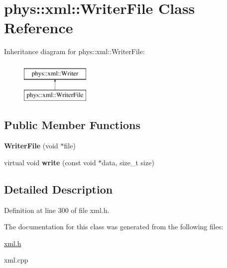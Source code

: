 \hypertarget{classphys_1_1xml_1_1WriterFile}{
\section{phys::xml::WriterFile Class Reference}
\label{dc/d53/classphys_1_1xml_1_1WriterFile}
}
Inheritance diagram for phys::xml::WriterFile:\begin{figure}[H]
\begin{center}
\leavevmode
\includegraphics[height=2cm]{dc/d53/classphys_1_1xml_1_1WriterFile}
\end{center}
\end{figure}
\subsection*{Public Member Functions}
\begin{DoxyCompactItemize}
\item 
\hypertarget{classphys_1_1xml_1_1WriterFile_aba665d4dc17c956798a80cb4e8c2774d}{
{\bfseries WriterFile} (void $\ast$file)}
\label{dc/d53/classphys_1_1xml_1_1WriterFile_aba665d4dc17c956798a80cb4e8c2774d}

\item 
\hypertarget{classphys_1_1xml_1_1WriterFile_a32cd8bff528e80601228098a019e551d}{
virtual void {\bfseries write} (const void $\ast$data, size\_\-t size)}
\label{dc/d53/classphys_1_1xml_1_1WriterFile_a32cd8bff528e80601228098a019e551d}

\end{DoxyCompactItemize}


\subsection{Detailed Description}


Definition at line 300 of file xml.h.



The documentation for this class was generated from the following files:\begin{DoxyCompactItemize}
\item 
\hyperlink{xml_8h}{xml.h}\item 
xml.cpp\end{DoxyCompactItemize}

